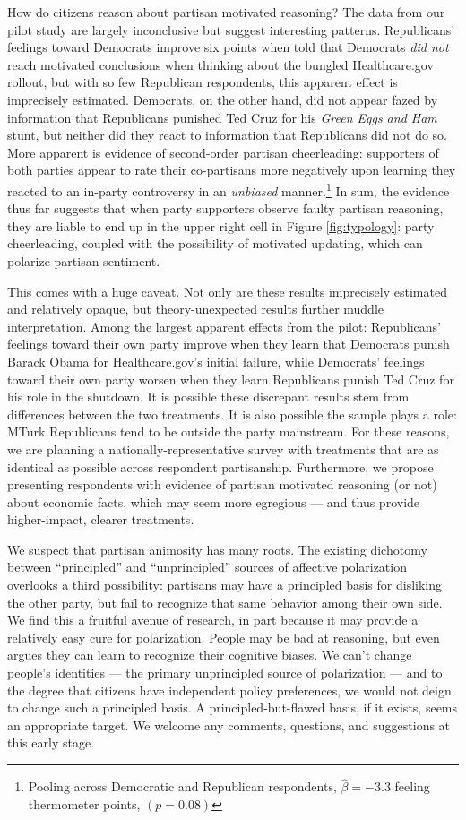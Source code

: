 \documentclass[12pt, letterpaper]{article}
\begin{document}
How do citizens reason about partisan motivated reasoning? The data from our pilot study are largely inconclusive but suggest interesting patterns. Republicans' feelings toward Democrats improve six points when told that Democrats \emph{did not} reach motivated conclusions when thinking about the bungled Healthcare.gov rollout, but with so few Republican respondents, this apparent effect is imprecisely estimated. Democrats, on the other hand, did not appear fazed by information that Republicans punished Ted Cruz for his \emph{Green Eggs and Ham} stunt, but neither did they react to information that Republicans did not do so. More apparent is evidence of second-order partisan cheerleading: supporters of both parties appear to rate their co-partisans more negatively upon learning they reacted to an in-party controversy in an \emph{unbiased} manner.\footnote{Pooling across Democratic and Republican respondents, $\hat{\beta}=-3.3$ feeling thermometer points, $(p=0.08)$} In sum, the evidence thus far suggests that when party supporters observe faulty partisan reasoning, they are liable to end up in the upper right cell in Figure \ref{fig:typology}: party cheerleading, coupled with the possibility of motivated updating, which can polarize partisan sentiment.

This comes with a huge caveat. Not only are these results imprecisely estimated and relatively opaque, but theory-unexpected results further muddle interpretation. Among the largest apparent effects from the pilot: Republicans' feelings toward their own party improve when they learn that Democrats punish Barack Obama for Healthcare.gov's initial failure, while Democrats' feelings toward their own party worsen when they learn Republicans punish Ted Cruz for his role in the shutdown. It is possible these discrepant results stem from differences between the two treatments. It is also possible the sample plays a role: MTurk Republicans tend to be outside the party mainstream. For these reasons, we are planning a nationally-representative survey with treatments that are as identical as possible across respondent partisanship. Furthermore, we propose presenting respondents with evidence of partisan motivated reasoning (or not) about economic facts, which may seem more egregious --- and thus provide higher-impact, clearer treatments.

We suspect that partisan animosity has many roots. The existing dichotomy between ``principled'' and ``unprincipled'' sources of affective polarization overlooks a third possibility: partisans may have a principled basis for disliking the other party, but fail to recognize that same behavior among their own side. We find this a fruitful avenue of research, in part because it may provide a relatively easy cure for polarization. People may be bad at reasoning, but even \citet{Kahneman2011} argues they can learn to recognize their cognitive biases. We can't change people's identities --- the primary unprincipled source of polarization --- and to the degree that citizens have independent policy preferences, we would not deign to change such a principled basis. A principled-but-flawed basis, if it exists, seems an appropriate target. We welcome any comments, questions, and suggestions at this early stage.
\end{document}
